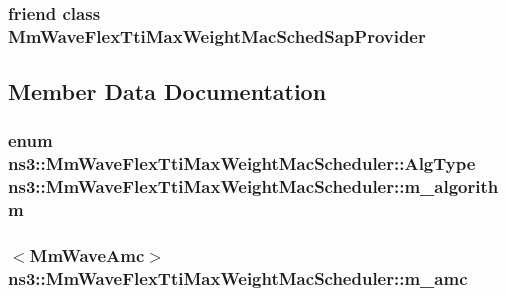 \subsubsection[{\texorpdfstring{Mm\+Wave\+Flex\+Tti\+Max\+Weight\+Mac\+Sched\+Sap\+Provider}{MmWaveFlexTtiMaxWeightMacSchedSapProvider}}]{\setlength{\rightskip}{0pt plus 5cm}friend class {\bf Mm\+Wave\+Flex\+Tti\+Max\+Weight\+Mac\+Sched\+Sap\+Provider}\hspace{0.3cm}{\ttfamily [friend]}}\hypertarget{classns3_1_1MmWaveFlexTtiMaxWeightMacScheduler_a61b688a098f2816e728a6f4be606ab79}{}\label{classns3_1_1MmWaveFlexTtiMaxWeightMacScheduler_a61b688a098f2816e728a6f4be606ab79}


\subsection{Member Data Documentation}
\subsubsection[{\texorpdfstring{m\+\_\+algorithm}{m_algorithm}}]{\setlength{\rightskip}{0pt plus 5cm}enum {\bf ns3\+::\+Mm\+Wave\+Flex\+Tti\+Max\+Weight\+Mac\+Scheduler\+::\+Alg\+Type}  ns3\+::\+Mm\+Wave\+Flex\+Tti\+Max\+Weight\+Mac\+Scheduler\+::m\+\_\+algorithm\hspace{0.3cm}{\ttfamily [private]}}\hypertarget{classns3_1_1MmWaveFlexTtiMaxWeightMacScheduler_a334a408b37c8c7cb50203d357021ea21}{}\label{classns3_1_1MmWaveFlexTtiMaxWeightMacScheduler_a334a408b37c8c7cb50203d357021ea21}
\subsubsection[{\texorpdfstring{m\+\_\+amc}{m_amc}}]{$<${\bf Mm\+Wave\+Amc}$>$ ns3\+::\+Mm\+Wave\+Flex\+Tti\+Max\+Weight\+Mac\+Scheduler\+::m\+\_\+amc\hspace{0.3cm}{\ttfamily [private]}}\hypertarget{classns3_1_1MmWaveFlexTtiMaxWeightMacScheduler_a36c22ad89fe5d6743a058f253a43a70d}{}\label{classns3_1_1MmWaveFlexTtiMaxWeightMacScheduler_a36c22ad89fe5d6743a058f253a43a70d}
